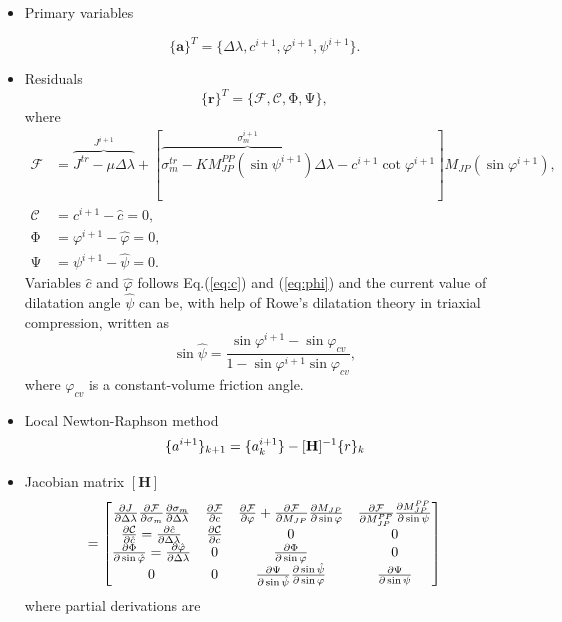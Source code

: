 \begin{itemize}
	\item Primary variables
	
	\begin{equation}
		\lbrace \mathbf{a} \rbrace ^T = \lbrace \Delta \lambda, c^{i+1}, \varphi^{i+1}, \psi^{i+1} \rbrace.
	\end{equation}
	
	\item Residuals
	\begin{equation}
		\lbrace \mathbf{r} \rbrace^T =  \lbrace \mathcal{F}, \mathcal{C}, \mathrm{\Phi}, \mathrm{\Psi} \rbrace,
	\end{equation}
	where \begin{align}
		\mathcal{F} &= \overbrace{J^{tr}-\mu\Delta\lambda}^{J^{i+1}} + [\overbrace{\sigma_m^{tr}-K M_{JP}^{PP}(\sin \psi^{i+1})\Delta\lambda}^{\sigma_m^{i+1}}-c^{i+1}\cot\varphi^{i+1}]M_{JP}(\sin\varphi^{i+1}),\label{eq:f_yc_lam}\\
		\mathcal{C} &= c^{i+1} - \hat{c} = 0,\label{eq:C_jac}\\
		\mathrm{\Phi} &= \varphi^{i+1} - \hat{\varphi} = 0,\label{eq:phi_jac}\\
		\mathrm{\Psi} &= \psi^{i+1} - \hat{\psi} = 0.
	\end{align}
	Variables $\hat{c}$ and $\hat{\varphi}$ follows Eq.(\ref{eq:c}) and (\ref{eq:phi}) and the current value of dilatation angle $\hat{\psi}$ can be, with help of Rowe's dilatation theory in triaxial compression, written as
	\begin{equation}
		\sin \hat{\psi} = \dfrac{\sin \varphi^{i+1} - \sin \varphi_{cv}}{1 - \sin \varphi^{i+1} \sin \varphi_{cv}},
	\end{equation}
	where $\varphi_{cv}$ is a constant-volume friction angle.
	
	\item Local Newton-Raphson method
	\begin{equation}\label{eq:newton_raphson}
		\lbrace a^{i+1} \rbrace _{k+1} = \lbrace a^{i+1}_k \rbrace - [\text{\textbf{H}}]^{-1} \lbrace r \rbrace_k 
	\end{equation}
	
	\item Jacobian matrix $[\textbf{H}]$
	\begin{equation}
		[\text{\textbf{H}}] = \mqty[\pdv{J}{\Delta \lambda} \pdv{\mathcal{F}}{\sigma_m} \pdv{\sigma_m}{\Delta \lambda} & \pdv{\mathcal{F}}{c} & \pdv{\mathcal{F}}{\varphi} + \pdv{\mathcal{F}}{M_{JP}} \pdv{M_{JP}}{\sin \varphi} & \pdv{\mathcal{F}}{M_{JP}^{PP}} \pdv{M_{JP}^{PP}}{\sin \psi}\\
		\pdv{\mathcal{C}}{\hat{c}} = \pdv{\hat{c}}{\Delta \lambda} & \pdv{\mathcal{C}}{c} & 0 & 0\\
		\pdv{\mathrm{\Phi}}{\sin \hat{\varphi}} = \pdv{\hat{\varphi}}{\Delta \lambda} & 0 & \pdv{\mathrm{\Phi}}{\sin \varphi} & 0 \\
		0 & 0 & \pdv{\mathrm{\Psi}}{\sin \hat{\psi}} \pdv{\sin \hat{\psi}}{\sin \varphi} & \pdv{\mathrm{\Psi}}{\sin \psi}]
	\end{equation}
	where partial derivations are
	

\end{itemize}
